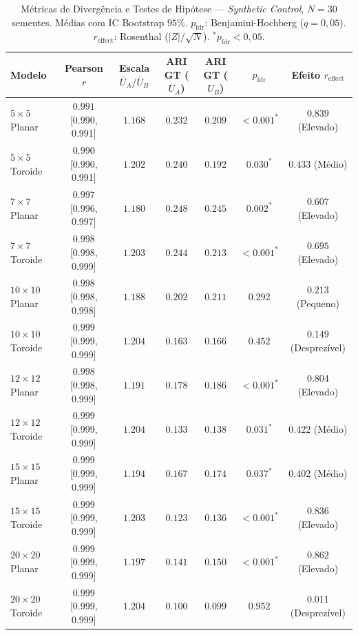 \documentclass[10pt,journal,compsoc,twocolumn]{IEEEtran}
\begin{document}
\begin{table}[htbp]
\centering
\caption{M\'etricas de Diverg\^encia e Testes de Hip\'otese --- \textit{Synthetic Control}, $N=30$ sementes.
M\'edias com IC Bootstrap $95\%$. $p_\text{fdr}$: Benjamini-Hochberg ($q=0{,}05$). $r_\text{effect}$: Rosenthal ($|Z|/\sqrt{N}$). $^*p_\text{fdr}<0{,}05$.}
\label{tab:divergencia}
\setlength{\tabcolsep}{5pt}
\footnotesize
\begin{tabular}{lcccccc}
\toprule
\textbf{Modelo} &
\textbf{Pearson $r$} &
\textbf{Escala $\bar{U}_A/\bar{U}_B$} &
\textbf{ARI GT ($U_A$)} &
\textbf{ARI GT ($U_B$)} &
\textbf{$p_\text{fdr}$} &
\textbf{Efeito $r_\text{effect}$} \\
\midrule
$5\times5$ Planar   & $0.991$ [0.990, 0.991] & $1.168$ & $0.232$ & $0.209$ & $<0.001^*$ & $0.839$ (Elevado) \\
$5\times5$ Toroide  & $0.990$ [0.990, 0.991] & $1.202$ & $0.240$ & $0.192$ & $0.030^*$  & $0.433$ (M\'edio) \\
$7\times7$ Planar   & $0.997$ [0.996, 0.997] & $1.180$ & $0.248$ & $0.245$ & $0.002^*$  & $0.607$ (Elevado) \\
$7\times7$ Toroide  & $0.998$ [0.998, 0.999] & $1.203$ & $0.244$ & $0.213$ & $<0.001^*$ & $0.695$ (Elevado) \\
$10\times10$ Planar & $0.998$ [0.998, 0.998] & $1.188$ & $0.202$ & $0.211$ & $0.292$   & $0.213$ (Pequeno) \\
$10\times10$ Toroide& $0.999$ [0.999, 0.999] & $1.204$ & $0.163$ & $0.166$ & $0.452$   & $0.149$ (Desprez\'ivel) \\
$12\times12$ Planar & $0.998$ [0.998, 0.999] & $1.191$ & $0.178$ & $0.186$ & $<0.001^*$ & $0.804$ (Elevado) \\
$12\times12$ Toroide& $0.999$ [0.999, 0.999] & $1.204$ & $0.133$ & $0.138$ & $0.031^*$  & $0.422$ (M\'edio) \\
$15\times15$ Planar & $0.999$ [0.999, 0.999] & $1.194$ & $0.167$ & $0.174$ & $0.037^*$  & $0.402$ (M\'edio) \\
$15\times15$ Toroide& $0.999$ [0.999, 0.999] & $1.203$ & $0.123$ & $0.136$ & $<0.001^*$ & $0.836$ (Elevado) \\
$20\times20$ Planar & $0.999$ [0.999, 0.999] & $1.197$ & $0.141$ & $0.150$ & $<0.001^*$ & $0.862$ (Elevado) \\
$20\times20$ Toroide& $0.999$ [0.999, 0.999] & $1.204$ & $0.100$ & $0.099$ & $0.952$   & $0.011$ (Desprez\'ivel) \\
\bottomrule
\end{tabular}
\end{table}
\end{document}
